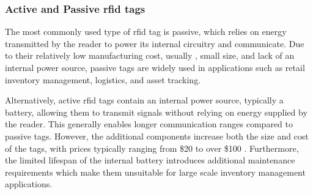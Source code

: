 \subsubsection{Active and Passive \acrshort{rfid} tags}
The most commonly used type of \acrshort{rfid} tag is passive, which relies on energy transmitted by the reader to power its internal circuitry and communicate. Due to their relatively low manufacturing cost, usually , small size, and lack of an internal power source, passive tags are widely used in applications such as retail inventory management, logistics, and asset tracking. 

Alternatively, active \acrshort{rfid} tags contain an internal power source, typically a battery, allowing them to transmit signals without relying on energy supplied by the reader. This generally enables longer communication ranges compared to passive tags. However, the additional components increase both the size and cost of the tags, with prices typically ranging from \$20 to over \$100 \cite{review-of-rfid-sensors}. Furthermore, the limited lifespan of the internal battery introduces additional maintenance requirements which make them unsuitable for large scale inventory management applications.

